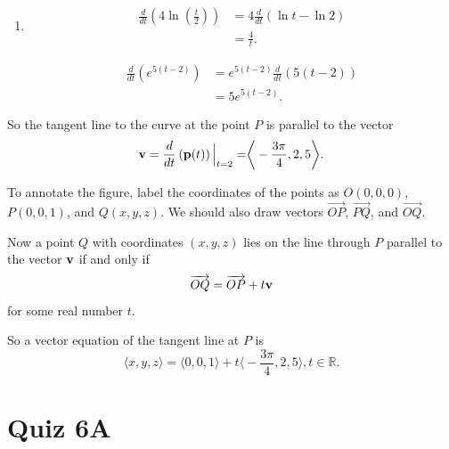 \documentclass{ximera}
\begin{document}
\begin{question}
\begin{explanation}
\begin{enumerate}
\item 
\begin{align*}
    \frac{d}{dt}\left( 4 \ln \left( \frac{t}{2}  \right) \right)  &=  4 \frac{d}{dt}\left( \ln t - \ln 2 \right)   \\
        &= \frac{4}{t} .
\end{align*}

\begin{align*}
    \frac{d}{dt}\left(  e^{5(t-2)} \right)  &= e^{5(t-2)} \frac{d}{dt}\left( 5(t-2) \right) \\
        &= 5 e^{5(t-2)} .
\end{align*}

\end{enumerate}

So the tangent line to the curve at the point $P$ is parallel to the vector
\[
 {\bf v} =  \frac{d}{dt}\left( {\bf p}(t) \right)\Big|_{t=2} = \biggr \langle -\frac{3\pi}{4} , 2, 5  \biggr \rangle . 
\] 

To annotate the figure,  label the coordinates of the points as $O(0,0,0)$, $P(0,0,1)$, and $Q(x,y,z)$. We should also draw vectors $\overrightarrow{OP}$, $\overrightarrow{PQ}$, and  $\overrightarrow{OQ}$.

Now a point $Q$ with coordinates $(x,y,z)$ lies on the line through $P$ parallel to the vector ${\bf v}$ if and only if
\[
   \overrightarrow{OQ} = \overrightarrow{OP} + t {\bf v} 
\]
for some real number $t$.

So a vector equation of the tangent line at $P$ is
\[
 \langle x, y, z\rangle  = \langle 0,0,1 \rangle + t \biggr \langle -\frac{3\pi}{4} , 2, 5  \biggr \rangle,  t\in \mathbb{R}.
\]
\end{explanation}
\end{question}



\section{Quiz 6A}
\end{document}
